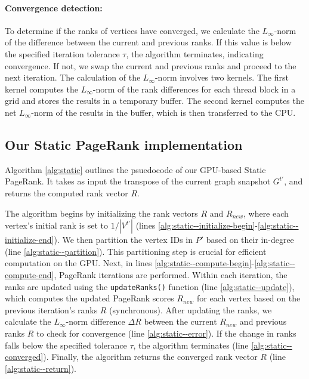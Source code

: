 \paragraph{Convergence detection:}

To determine if the ranks of vertices have converged, we calculate the $L_\infty$-norm of the difference between the current and previous ranks. If this value is below the specified iteration tolerance $\tau$, the algorithm terminates, indicating convergence. If not, we swap the current and previous ranks and proceed to the next iteration. The calculation of the $L_\infty$-norm involves two kernels. The first kernel computes the $L_\infty$-norm of the rank differences for each thread block in a grid and stores the results in a temporary buffer. The second kernel computes the net $L_\infty$-norm of the results in the buffer, which is then transferred to the CPU.




\subsection{Our Static PageRank implementation}
\label{sec:static-impl}

Algorithm \ref{alg:static} outlines the psuedocode of our GPU-based Static PageRank. It takes as input the transpose of the current graph snapshot $G^{t'}$, and returns the computed rank vector $R$.

The algorithm begins by initializing the rank vectors $R$ and $R_{new}$, where each vertex's initial rank is set to $1/|V^{t'}|$ (lines \ref{alg:static--initialize-begin}-\ref{alg:static--initialize-end}). We then partition the vertex IDs in $P'$ based on their in-degree (line \ref{alg:static--partition}). This partitioning step is crucial for efficient computation on the GPU. Next, in lines \ref{alg:static--compute-begin}-\ref{alg:static--compute-end}, PageRank iterations are performed. Within each iteration, the ranks are updated using the \texttt{updateRanks()} function (line \ref{alg:static--update}), which computes the updated PageRank scores $R_{new}$ for each vertex based on the previous iteration's ranks $R$ (synchronous). After updating the ranks, we calculate the $L_\infty$-norm difference $\Delta R$ between the current $R_{new}$ and previous ranks $R$ to check for convergence (line \ref{alg:static--error}). If the change in ranks falls below the specified tolerance $\tau$, the algorithm terminates (line \ref{alg:static--converged}). Finally, the algorithm returns the converged rank vector $R$ (line \ref{alg:static--return}).

